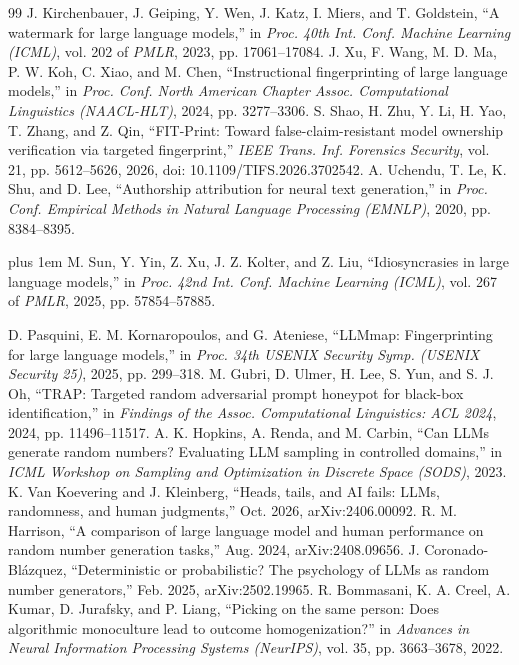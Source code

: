 \documentclass[10pt,journal,compsoc]{IEEEtran}
\begin{document}
\begin{thebibliography}{99}
 J. Kirchenbauer, J. Geiping, Y. Wen, J. Katz, I. Miers, and T. Goldstein, ``A watermark for large language models,'' in \emph{Proc. 40th Int. Conf. Machine Learning (ICML)}, vol. 202 of \emph{PMLR}, 2023, pp. 17061--17084.
 J. Xu, F. Wang, M. D. Ma, P. W. Koh, C. Xiao, and M. Chen, ``Instructional fingerprinting of large language models,'' in \emph{Proc. Conf. North American Chapter Assoc. Computational Linguistics (NAACL-HLT)}, 2024, pp. 3277--3306.
 S. Shao, H. Zhu, Y. Li, H. Yao, T. Zhang, and Z. Qin, ``FIT-Print: Toward false-claim-resistant model ownership verification via targeted fingerprint,'' \emph{IEEE Trans. Inf. Forensics Security}, vol. 21, pp. 5612--5626, 2026, doi: 10.1109/TIFS.2026.3702542.
 A. Uchendu, T. Le, K. Shu, and D. Lee, ``Authorship attribution for neural text generation,'' in \emph{Proc. Conf. Empirical Methods in Natural Language Processing (EMNLP)}, 2020, pp. 8384--8395.
 { \rightskip=0pt plus 1em M. Sun, Y. Yin, Z. Xu, J. Z. Kolter, and Z. Liu, ``Idiosyncrasies in large language models,'' in \emph{Proc. 42nd Int. Conf. Machine Learning (ICML)}, vol. 267 of \emph{PMLR}, 2025, pp. 57854--57885.\par}
 D. Pasquini, E. M. Kornaropoulos, and G. Ateniese, ``LLMmap: Fingerprinting for large language models,'' in \emph{Proc. 34th USENIX Security Symp. (USENIX Security 25)}, 2025, pp. 299--318.
 M. Gubri, D. Ulmer, H. Lee, S. Yun, and S. J. Oh, ``TRAP: Targeted random adversarial prompt honeypot for black-box identification,'' in \emph{Findings of the Assoc. Computational Linguistics: ACL 2024}, 2024, pp. 11496--11517.
 A. K. Hopkins, A. Renda, and M. Carbin, ``Can LLMs generate random numbers? Evaluating LLM sampling in controlled domains,'' in \emph{ICML Workshop on Sampling and Optimization in Discrete Space (SODS)}, 2023.
 K. Van Koevering and J. Kleinberg, ``Heads, tails, and AI fails: LLMs, randomness, and human judgments,'' Oct. 2026, arXiv:2406.00092.
 R. M. Harrison, ``A comparison of large language model and human performance on random number generation tasks,'' Aug. 2024, arXiv:2408.09656.
 J. Coronado-\hspace{0pt}Bl\'{a}zquez, ``Deterministic or probabilistic? The psychology of LLMs as random number generators,'' Feb. 2025, arXiv:2502.19965.
 R. Bommasani, K. A. Creel, A. Kumar, D. Jurafsky, and P. Liang, ``Picking on the same person: Does algorithmic monoculture lead to outcome homogenization?'' in \emph{Advances in Neural Information Processing Systems (NeurIPS)}, vol. 35, pp. 3663--3678, 2022.

\end{thebibliography}
\end{document}
